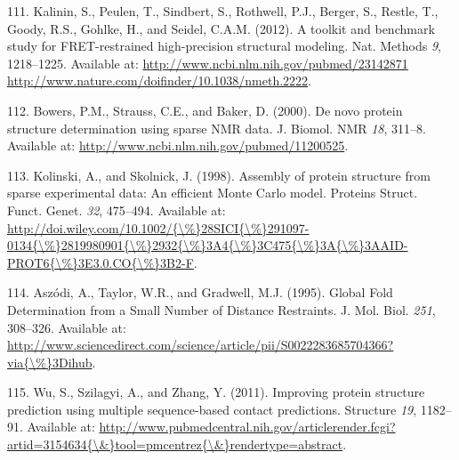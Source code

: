 \documentclass[11pt,a4paper,twoside]{book}
\theoremstyle{definition}
\theoremstyle{definition}
\theoremstyle{remark}
\begin{document}
\hypertarget{ref-Kalinin2012}{}
111. Kalinin, S., Peulen, T., Sindbert, S., Rothwell, P.J., Berger, S.,
Restle, T., Goody, R.S., Gohlke, H., and Seidel, C.A.M. (2012). A
toolkit and benchmark study for FRET-restrained high-precision
structural modeling. Nat. Methods \emph{9}, 1218--1225. Available at:
\href{http://www.ncbi.nlm.nih.gov/pubmed/23142871\%20http://www.nature.com/doifinder/10.1038/nmeth.2222}{http://www.ncbi.nlm.nih.gov/pubmed/23142871 http://www.nature.com/doifinder/10.1038/nmeth.2222}.

\hypertarget{ref-Bowers2000}{}
112. Bowers, P.M., Strauss, C.E., and Baker, D. (2000). De novo protein
structure determination using sparse NMR data. J. Biomol. NMR \emph{18},
311--8. Available at: \url{http://www.ncbi.nlm.nih.gov/pubmed/11200525}.

\hypertarget{ref-Kolinski1998}{}
113. Kolinski, A., and Skolnick, J. (1998). Assembly of protein
structure from sparse experimental data: An efficient Monte Carlo model.
Proteins Struct. Funct. Genet. \emph{32}, 475--494. Available at:
\href{http://doi.wiley.com/10.1002/\%7B/\%\%7D28SICI\%7B/\%\%7D291097-0134\%7B/\%\%7D2819980901\%7B/\%\%7D2932\%7B/\%\%7D3A4\%7B/\%\%7D3C475\%7B/\%\%7D3A\%7B/\%\%7D3AAID-PROT6\%7B/\%\%7D3E3.0.CO\%7B/\%\%7D3B2-F}{http://doi.wiley.com/10.1002/\{\textbackslash{}\%\}28SICI\{\textbackslash{}\%\}291097-0134\{\textbackslash{}\%\}2819980901\{\textbackslash{}\%\}2932\{\textbackslash{}\%\}3A4\{\textbackslash{}\%\}3C475\{\textbackslash{}\%\}3A\{\textbackslash{}\%\}3AAID-PROT6\{\textbackslash{}\%\}3E3.0.CO\{\textbackslash{}\%\}3B2-F}.

\hypertarget{ref-Aszodi1995a}{}
114. Aszódi, A., Taylor, W.R., and Gradwell, M.J. (1995). Global Fold
Determination from a Small Number of Distance Restraints. J. Mol. Biol.
\emph{251}, 308--326. Available at:
\href{http://www.sciencedirect.com/science/article/pii/S0022283685704366?via\%7B/\%\%7D3Dihub}{http://www.sciencedirect.com/science/article/pii/S0022283685704366?via\{\textbackslash{}\%\}3Dihub}.

\hypertarget{ref-Wu2011}{}
115. Wu, S., Szilagyi, A., and Zhang, Y. (2011). Improving protein
structure prediction using multiple sequence-based contact predictions.
Structure \emph{19}, 1182--91. Available at:
\href{http://www.pubmedcentral.nih.gov/articlerender.fcgi?artid=3154634\%7B/\&\%7Dtool=pmcentrez\%7B/\&\%7Drendertype=abstract}{http://www.pubmedcentral.nih.gov/articlerender.fcgi?artid=3154634\{\textbackslash{}\&\}tool=pmcentrez\{\textbackslash{}\&\}rendertype=abstract}.
\end{document}
